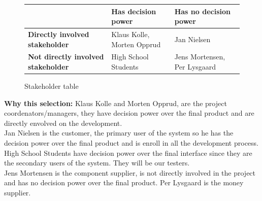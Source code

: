 \begin{figure}[h!]
 \begin{centering}
  \begin{tabular}{| l | l | l |}
   \hline
      & \textbf{Has decision power} & \textbf{Has no decision power} \\ \hline
    \textbf{Directly involved stakeholder} & Klaus Kolle,
    Morten Opprud &  Jan Nielsen \\ \hline \textbf{Not directly involved
    stakeholder} & High School Students & Jens Mortensen, Per Lysgaard \\
    \hline
   \end{tabular}
  \end{centering}
 \caption{Stakeholder table}
\end{figure}

\textbf{Why this selection: } \newline
Klaus Kolle and Morten Opprud, are the project coordenators/managers, they
have decision power over the final product and are directly envolved on the
development.\\
\newline
Jan Nielsen is the customer, the primary user of the system so he has the
decision power over the final product and is enroll in all the development
process.\\
\newline
High School Students have decision power over the final interface since they
are the secondary users of the system. They will be our testers.\\
\newline
Jens Mortensen is the component supplier, is not directly involved in the
project and has no decision power over the final product.
\newline
Per Lysgaard is the money supplier.
\newline
\newpage

